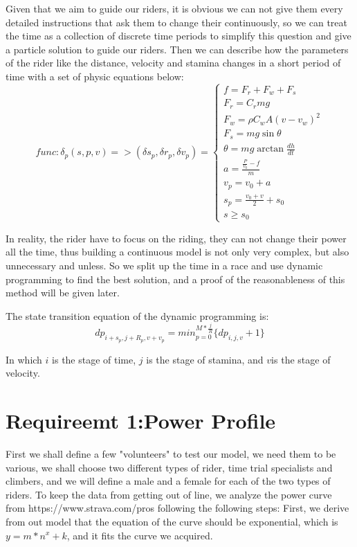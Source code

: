 \documentclass[12pt]{article}
\begin{document}
Given that we aim to guide our riders, it is obvious we can not give them every detailed instructions that ask them to change their continuously, so we can treat the time
as a collection of discrete time periods to simplify this question and give a particle solution to guide our riders.
Then we can describe how the parameters of the rider like the distance, velocity and stamina changes in a short period of time with a set of physic equations below:
\begin{equation}
    func: \delta_p(s,p,v)=>( \delta s_p,\delta r_p,\delta v_p)=\left\{
    \begin{array}{c}
        f=F_r+F_w+F_s                   \\
        F_r=C_rmg                       \\
        F_w=\rho C_w A(v-v_w)^2         \\
        F_s=mg\sin \theta               \\
        \theta=mg\arctan\frac{d h}{d t} \\
        a=\frac{\frac{P}{v_0}-f}{m}     \\
        v_p=v_0+a                       \\
        s_p=\frac{v_0+v}{2}+s_0         \\
        s\geqslant s_0
    \end{array}
    \right.
\end{equation}

In reality, the rider have to focus on the riding, they can not change their power all the time, thus building a continuous model is not only very complex,
but also unnecessary and unless. So we split up the time in a race and use dynamic programming to find the best solution,
and a proof of the reasonableness of this method will be given later.

The state transition equation of the dynamic programming is:$$dp_{i+s_p,j+R_p,v+v_p}= min_{p = 0}^{M*\frac{j}{R}}\{dp_{i,j,v}+1\}$$

In which $i$ is the stage of time, $j$ is the stage of stamina, and $v$is the stage of velocity.
\section{Requireemt 1:Power Profile}
First we shall define a few "volunteers" to test our model, we need them to be various, we shall choose two different types of rider, time trial
specialists and climbers, and we will define a male and a female for each of the two types of riders. To keep the data from getting out of line, we analyze the power curve
from https://www.strava.com/pros following the following steps:
First, we derive from out model that the equation of the curve should be exponential, which is $y=m*n^x+k$, and it fits the curve we acquired.
\end{document}
